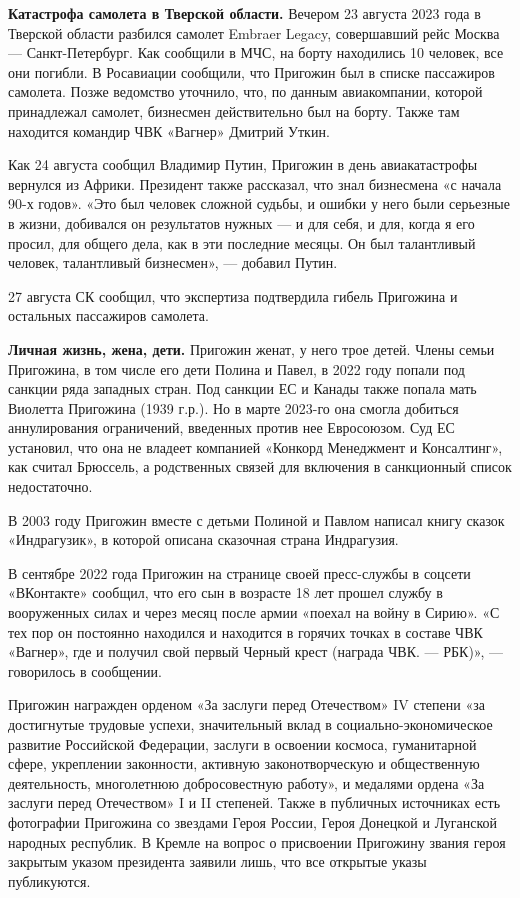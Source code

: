 \textbf{Катастрофа самолета в Тверской области.} Вечером 23 августа 2023 года в Тверской области разбился самолет Embraer Legacy, совершавший рейс Москва — Санкт-Петербург. Как сообщили в МЧС, на борту находились 10 человек, все они погибли. В Росавиации сообщили, что Пригожин был в списке пассажиров самолета. Позже ведомство уточнило, что, по данным авиакомпании, которой принадлежал самолет, бизнесмен действительно был на борту. Также там находится командир ЧВК «Вагнер» Дмитрий Уткин.

Как 24 августа сообщил Владимир Путин, Пригожин в день авиакатастрофы вернулся из Африки. Президент также рассказал, что знал бизнесмена «с начала 90-х годов». «Это был человек сложной судьбы, и ошибки у него были серьезные в жизни, добивался он результатов нужных — и для себя, и для, когда я его просил, для общего дела, как в эти последние месяцы. Он был талантливый человек, талантливый бизнесмен», — добавил Путин.

27 августа СК сообщил, что экспертиза подтвердила гибель Пригожина и остальных пассажиров самолета.

\textbf{Личная жизнь, жена, дети.} Пригожин женат, у него трое детей. Члены семьи Пригожина, в том числе его дети Полина и Павел, в 2022 году попали под санкции ряда западных стран. Под санкции ЕС и Канады также попала мать Виолетта Пригожина (1939 г.р.). Но в марте 2023-го она смогла добиться аннулирования ограничений, введенных против нее Евросоюзом. Суд ЕС установил, что она не владеет компанией «Конкорд Менеджмент и Консалтинг», как считал Брюссель, а родственных связей для включения в санкционный список недостаточно.

В 2003 году Пригожин вместе с детьми Полиной и Павлом написал книгу сказок «Индрагузик», в которой описана сказочная страна Индрагузия.

В сентябре 2022 года Пригожин на странице своей пресс-службы в соцсети «ВКонтакте» сообщил, что его сын в возрасте 18 лет прошел службу в вооруженных силах и через месяц после армии «поехал на войну в Сирию». «С тех пор он постоянно находился и находится в горячих точках в составе ЧВК «Вагнер», где и получил свой первый Черный крест (награда ЧВК. — РБК)», — говорилось в сообщении.

Пригожин награжден орденом «За заслуги перед Отечеством» IV степени «за достигнутые трудовые успехи, значительный вклад в социально-экономическое развитие Российской Федерации, заслуги в освоении космоса, гуманитарной сфере, укреплении законности, активную законотворческую и общественную деятельность, многолетнюю добросовестную работу», и медалями ордена «За заслуги перед Отечеством» I и II степеней. Также в публичных источниках есть фотографии Пригожина со звездами Героя России, Героя Донецкой и Луганской народных республик. В Кремле на вопрос о присвоении Пригожину звания героя закрытым указом президента заявили лишь, что все открытые указы публикуются.

